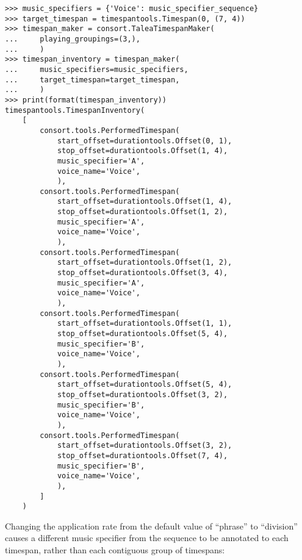 \begin{abjadbookoutput}
\begin{singlespacing}
\vspace{-0.5\baselineskip}
\begin{lstlisting}
>>> music_specifiers = {'Voice': music_specifier_sequence}
>>> target_timespan = timespantools.Timespan(0, (7, 4))
>>> timespan_maker = consort.TaleaTimespanMaker(
...     playing_groupings=(3,),
...     )
>>> timespan_inventory = timespan_maker(
...     music_specifiers=music_specifiers,
...     target_timespan=target_timespan,
...     )
>>> print(format(timespan_inventory))
timespantools.TimespanInventory(
    [
        consort.tools.PerformedTimespan(
            start_offset=durationtools.Offset(0, 1),
            stop_offset=durationtools.Offset(1, 4),
            music_specifier='A',
            voice_name='Voice',
            ),
        consort.tools.PerformedTimespan(
            start_offset=durationtools.Offset(1, 4),
            stop_offset=durationtools.Offset(1, 2),
            music_specifier='A',
            voice_name='Voice',
            ),
        consort.tools.PerformedTimespan(
            start_offset=durationtools.Offset(1, 2),
            stop_offset=durationtools.Offset(3, 4),
            music_specifier='A',
            voice_name='Voice',
            ),
        consort.tools.PerformedTimespan(
            start_offset=durationtools.Offset(1, 1),
            stop_offset=durationtools.Offset(5, 4),
            music_specifier='B',
            voice_name='Voice',
            ),
        consort.tools.PerformedTimespan(
            start_offset=durationtools.Offset(5, 4),
            stop_offset=durationtools.Offset(3, 2),
            music_specifier='B',
            voice_name='Voice',
            ),
        consort.tools.PerformedTimespan(
            start_offset=durationtools.Offset(3, 2),
            stop_offset=durationtools.Offset(7, 4),
            music_specifier='B',
            voice_name='Voice',
            ),
        ]
    )
\end{lstlisting}
\end{singlespacing}
\end{abjadbookoutput}

\noindent Changing the application rate from the default value of
\enquote{phrase} to \enquote{division} causes a different music specifier from
the sequence to be annotated to each timespan, rather than each contiguous
group of timespans:

\begin{comment}
<abjad>
music_specifier_sequence = new(
    music_specifier_sequence,
    application_rate='division',
    )
music_specifiers = {'Voice': music_specifier_sequence}
timespan_inventory = timespan_maker(
    music_specifiers=music_specifiers,
    target_timespan=target_timespan,
    )
print(format(timespan_inventory))
</abjad>
\end{comment}

